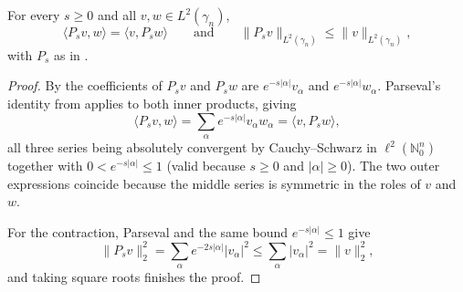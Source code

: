 \begin{lemma}
For every $s \geq 0$ and all $v, w \in L^2(\gamma_n)$,
\[
  \langle P_s v, w\rangle = \langle v, P_s w\rangle
  \qquad\text{and}\qquad
  \|P_s v\|_{L^2(\gamma_n)} \leq \|v\|_{L^2(\gamma_n)} ,
\]
with $P_s$ as in .
\end{lemma}
\begin{proof}
By  the coefficients of $P_s v$ and $P_s w$ are
$e^{-s|\alpha|}v_\alpha$ and $e^{-s|\alpha|}w_\alpha$.  Parseval's identity from
 applies to both inner products, giving
\[
  \langle P_s v, w\rangle = \sum_\alpha e^{-s|\alpha|} v_\alpha w_\alpha
    = \langle v, P_s w\rangle ,
\]
all three series being absolutely convergent by Cauchy--Schwarz in
$\ell^2(\mathbb{N}_0^n)$ together with $0 < e^{-s|\alpha|} \leq 1$ (valid because
$s \geq 0$ and $|\alpha| \geq 0$).  The two outer expressions coincide because the
middle series is symmetric in the roles of $v$ and $w$.

For the contraction, Parseval and the same bound $e^{-s|\alpha|} \leq 1$ give
\[
  \|P_s v\|_2^2 = \sum_\alpha e^{-2s|\alpha|}|v_\alpha|^2
    \leq \sum_\alpha |v_\alpha|^2 = \|v\|_2^2 ,
\]
and taking square roots finishes the proof.
\end{proof}
